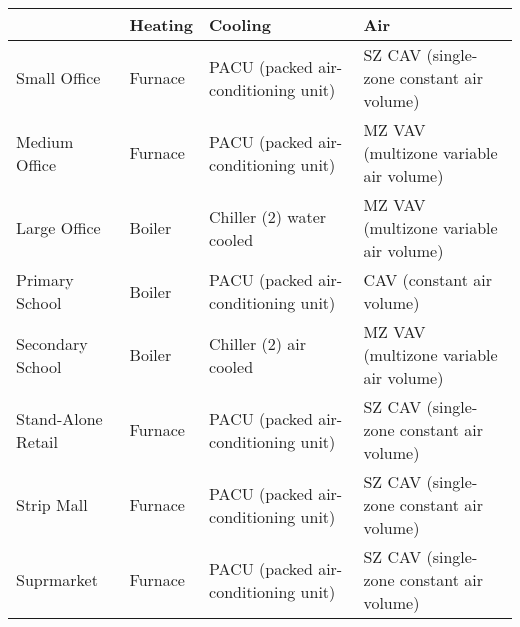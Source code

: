 \begin{table}[h!]
\centering
\scriptsize
\caption{Benchmark Building HVAC System}
\label{tab:hvac}
\begin{longtable}{p{2cm}|p{2cm}|p{4cm}|p{4cm}}
  \hline
  & Heating                                & Cooling                                                                     & Air                                                     \\
  \hline
  \hline
  Small Office             & Furnace                                & PACU (packed air-conditioning unit)                                         & SZ CAV (single-zone constant air volume)                \\
  \hline
  Medium Office            & Furnace                                & PACU (packed air-conditioning unit)                                         & MZ VAV (multizone variable air volume)                  \\
  \hline
  Large Office             & Boiler                                 & Chiller (2) water cooled                                                    & MZ VAV (multizone variable air volume)                  \\
  \hline
  Primary School           & Boiler                                 & PACU (packed air-conditioning unit)                                         & CAV (constant air volume)                               \\
  \hline
  Secondary School         & Boiler                                 & Chiller (2) air cooled                                                      & MZ VAV (multizone variable air volume)                  \\
  \hline
  Stand-Alone Retail       & Furnace                                & PACU (packed air-conditioning unit)                                         & SZ CAV (single-zone constant air volume)                \\
  \hline
  Strip Mall               & Furnace                                & PACU (packed air-conditioning unit)                                         & SZ CAV (single-zone constant air volume)                \\
  \hline
  Suprmarket               & Furnace                                & PACU (packed air-conditioning unit)                                         & SZ CAV (single-zone constant air volume)                \\
  \hline

\end{longtable}
\end{table}
